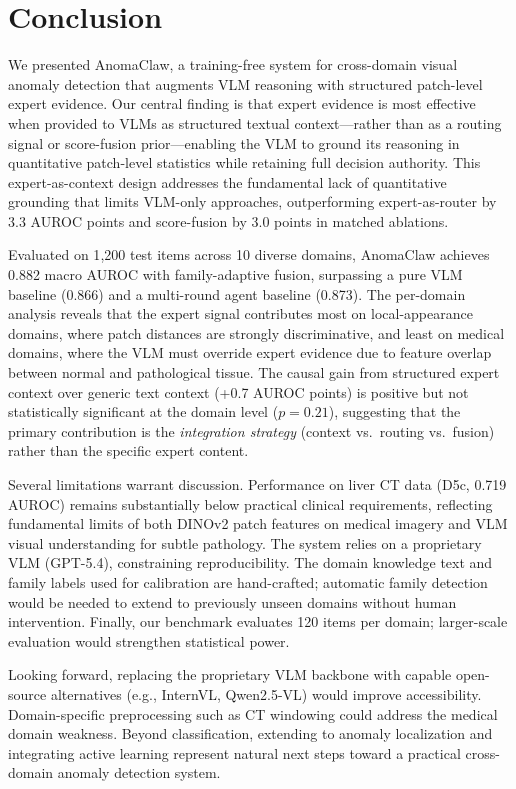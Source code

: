 \section{Conclusion}
\label{sec:conclusion}

We presented AnomaClaw, a training-free system for cross-domain visual anomaly detection that augments VLM reasoning with structured patch-level expert evidence. Our central finding is that expert evidence is most effective when provided to VLMs as structured textual context---rather than as a routing signal or score-fusion prior---enabling the VLM to ground its reasoning in quantitative patch-level statistics while retaining full decision authority. This expert-as-context design addresses the fundamental lack of quantitative grounding that limits VLM-only approaches, outperforming expert-as-router by 3.3 AUROC points and score-fusion by 3.0 points in matched ablations.

Evaluated on 1{,}200 test items across 10 diverse domains, AnomaClaw achieves 0.882 macro AUROC with family-adaptive fusion, surpassing a pure VLM baseline (0.866) and a multi-round agent baseline (0.873). The per-domain analysis reveals that the expert signal contributes most on local-appearance domains, where patch distances are strongly discriminative, and least on medical domains, where the VLM must override expert evidence due to feature overlap between normal and pathological tissue. The causal gain from structured expert context over generic text context (+0.7 AUROC points) is positive but not statistically significant at the domain level ($p = 0.21$), suggesting that the primary contribution is the \emph{integration strategy} (context vs.\ routing vs.\ fusion) rather than the specific expert content.

Several limitations warrant discussion. Performance on liver CT data (D5c, 0.719 AUROC) remains substantially below practical clinical requirements, reflecting fundamental limits of both DINOv2 patch features on medical imagery and VLM visual understanding for subtle pathology. The system relies on a proprietary VLM (GPT-5.4), constraining reproducibility. The domain knowledge text and family labels used for calibration are hand-crafted; automatic family detection would be needed to extend to previously unseen domains without human intervention. Finally, our benchmark evaluates 120 items per domain; larger-scale evaluation would strengthen statistical power.

Looking forward, replacing the proprietary VLM backbone with capable open-source alternatives (e.g., InternVL, Qwen2.5-VL) would improve accessibility. Domain-specific preprocessing such as CT windowing could address the medical domain weakness. Beyond classification, extending to anomaly localization and integrating active learning represent natural next steps toward a practical cross-domain anomaly detection system.
